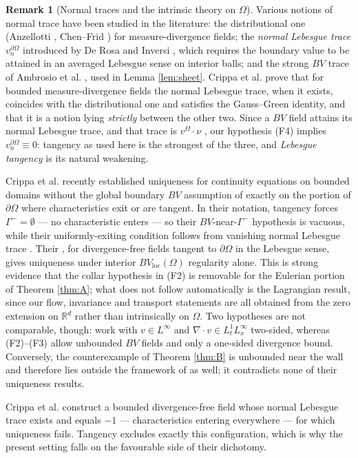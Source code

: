 \documentclass[11pt]{amsart}
\theoremstyle{definition}
\newtheorem{remark}[theorem]{Remark}
\newcommand{\dive}{\nabla\!\cdot}
\newcommand{\R}{\mathbb{R}}
\begin{document}
\begin{remark}[Normal traces and
the intrinsic theory on $\Omega$]\label{rem:CDIN}
Various notions of normal trace have been studied in the literature:
the distributional one (Anzellotti \cite{Anzellotti}, Chen--Frid
\cite{ChenFrid}) for measure-divergence fields; the
\emph{normal Lebesgue trace} $v^{\partial\Omega}_n$ introduced by De
Rosa and Inversi \cite{DeRosaInversi}, which requires the boundary
value to be attained in an averaged Lebesgue sense on interior
balls; and the strong $BV$ trace of  Ambrosio et al. \cite[Thm.~3.87]{AFP}, used in
Lemma \ref{lem:sheet}. Crippa et al. \cite{CDRIN} prove that for bounded
measure-divergence fields the normal Lebesgue trace, when it exists,
coincides with the distributional one and satisfies the Gauss--Green
identity, and that it is a notion lying \emph{strictly} between the
other two. Since a $BV$ field attains its normal Lebesgue trace, and
that trace is $v^\Omega\cdot\nu$ \cite[Prop.~5.5]{DeRosaInversi},
our hypothesis \textup{(F4)} implies
$v^{\partial\Omega}_n\equiv0$: tangency as used here is the
strongest of the three, and \emph{Lebesgue tangency} is its natural
weakening.

Crippa et al. \cite{CDRIN} recently established uniqueness for
continuity equations on bounded domains without the global
boundary $BV$ assumption of \cite{CDS} exactly on the portion of
$\partial\Omega$ where characteristics exit or are tangent. In their
notation, tangency forces $\Gamma^-=\emptyset$ --- no characteristic
enters --- so their $BV$-near-$\Gamma^-$ hypothesis is vacuous,
while their uniformly-exiting condition follows from vanishing
normal Lebesgue trace \cite[Cor.~3.9]{CDRIN}. Their
\cite[Cor.~4.6]{CDRIN}, for divergence-free fields tangent to
$\partial\Omega$ in the Lebesgue sense, gives uniqueness under
interior $BV_{\mathrm{loc}}(\Omega)$ regularity alone. This is
strong evidence that the collar hypothesis in \textup{(F2)} is
removable for the Eulerian portion of Theorem \ref{thm:A}; what does
not follow automatically is the Lagrangian result, since our flow,
invariance and transport statements are all obtained from the zero
extension on $\R^d$ rather than intrinsically on $\Omega$.  Two hypotheses are not comparable,
though: \cite{CDRIN} work with $v\in L^\infty$ and $\dive v\in
L^1_tL^\infty_x$ two-sided, whereas \textup{(F2)--(F3)} allow
unbounded $BV$ fields and only a one-sided divergence bound.
Conversely, the counterexample of Theorem \ref{thm:B} is unbounded
near the wall and therefore lies outside the framework of
\cite{CDRIN} as well; it contradicts none of their uniqueness
results.

Crippa et al. \cite{CDRIN} construct a bounded divergence-free field whose
normal Lebesgue trace exists and equals $-1$ --- characteristics
entering everywhere --- for which uniqueness fails. Tangency
excludes exactly this configuration, which is why the present
setting falls on the favourable side of their dichotomy.
\end{remark}
\end{document}
